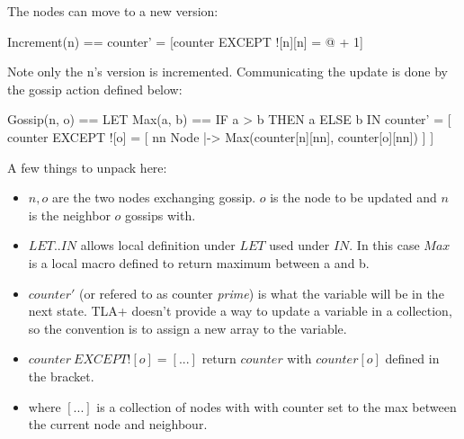 \documentclass{report}
\begin{document}
The nodes can move to a new version: 
\begin{tla}
    Increment(n) == counter' = [counter EXCEPT ![n][n] = @ + 1]
\end{tla}
\begin{tlatex}
\end{tlatex}
 \newline\newline
Note only the n's version is incremented. Communicating the update is done by
the gossip action defined below:\newline
\begin{tla}
Gossip(n, o) ==                  
    LET Max(a, b) == IF a > b THEN a ELSE b 
    IN counter' = [
        counter EXCEPT ![o] = [
            nn \in Node |->            
                Max(counter[n][nn], counter[o][nn])
            ] 
    ]
\end{tla}
\begin{tlatex}
%
\@x{\@s{16.4} \.{\IN} counter \.{'} \.{=} [}%
\@x{\@s{40.89} counter {\EXCEPT} {\bang} [ o ] \.{=} [}%
%
%
\@x{\@s{57.29} ]}%
\@x{\@s{16.4} ]}%
\end{tlatex}
\newline

A few things to unpack here:
\begin{itemize}
    \item $n, o$ are the two nodes exchanging gossip. $o$ is the node to be updated
    and $n$ is the neighbor $o$ gossips with.
    \item $LET .. IN$ allows local definition under $LET$ used under
    $IN$. In this case $Max$ is a local macro defined to return maximum between a and b.
    \item $counter'$ (or refered to as counter \textit{prime}) is what the
    variable will be in the next state. TLA+ doesn't provide a way to update a
    variable in a collection, so the convention is to assign a new array to the variable. 
    \item $counter\ EXCEPT ![o] = [...]$ return $counter$ with $counter[o]$
    defined in the bracket. 
    \item where $[...]$ is a collection of nodes with with counter set to the
    max between the current node and neighbour.
\end{itemize}
\end{document}
